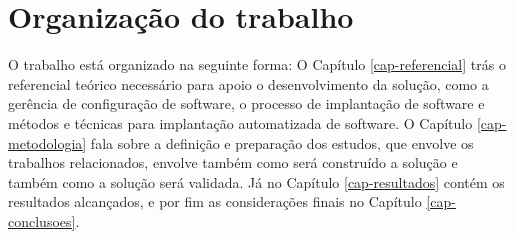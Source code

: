 \section{Organização do trabalho}
\label{sec:organizacao}

O trabalho está organizado na seguinte forma: O Capítulo \ref{cap-referencial}
trás o referencial teórico necessário para apoio o desenvolvimento da solução,
como a gerência de configuração de software, o processo de implantação de software
 e métodos e técnicas para implantação automatizada de software. O Capítulo
\ref{cap-metodologia}
fala sobre a definição e preparação dos estudos, que envolve os trabalhos relacionados,
envolve também como será construído a solução e também como a solução será validada.
Já no Capítulo \ref{cap-resultados} contém os resultados alcançados, e por fim as
considerações finais no Capítulo \ref{cap-conclusoes}.

